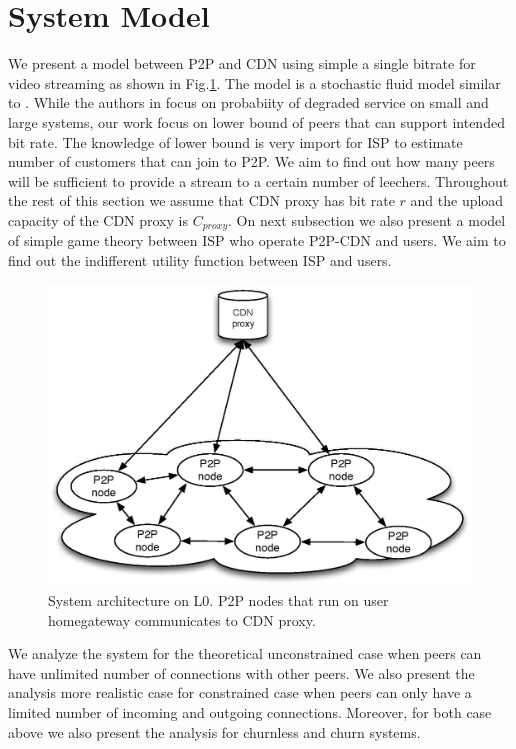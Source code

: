 \documentclass[paper]{ieice}
\begin{document}
\section{System Model}\label{systemmodel}
We present a model between P2P and CDN using simple a single bitrate for video streaming as shown in Fig.\ref{fig:twotier2}. 
The model is a stochastic fluid model similar to \cite{4215694}.
While the authors in \cite{4215694} focus on probabiity of degraded service on small and large systems, our work focus on lower bound of peers that can support intended bit rate.
The knowledge of lower bound is very import for ISP to estimate number of customers that can join to P2P.
We aim to find out how many peers will be sufficient to provide a stream to a certain number of leechers.
Throughout the rest of this section we assume that CDN proxy has bit rate $r$  and the upload capacity of the CDN proxy is $C_{proxy}$.
On next subsection we also present a model of simple game theory between ISP who operate P2P-CDN and users.
We aim to find out the indifferent utility function between ISP and users.

\begin{figure}[tb] 
\begin{center}
\includegraphics[scale=0.35]{graphs/two-tier-cdn-topology-2.eps}
\end{center}
\caption{System architecture on L0. P2P nodes that run on user homegateway communicates to CDN proxy.}
\label{fig:twotier2}
\vspace{-2mm}
 \end{figure}


We analyze the system for the theoretical unconstrained case when peers can have unlimited number of connections with other peers.
We also present the analysis more realistic case for constrained case when peers can only have a limited number of incoming and outgoing connections.
Moreover, for both case above we also present the analysis for churnless and churn systems.
\end{document}
